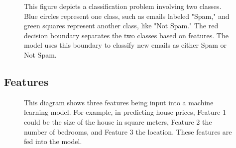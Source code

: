 \documentclass[12pt]{article}
\begin{document}
\begin{figure}[H]
\centering
{}
    \caption{This figure depicts a classification problem involving two classes. Blue circles represent one class, such as emails labeled "Spam," and green squares represent another class, like "Not Spam." The red decision boundary separates the two classes based on features. The model uses this boundary to classify new emails as either Spam or Not Spam.}
    \label{fig:regression_example}
\end{figure}

\subsection{Features}

\begin{figure}[H]
\centering
{}
    \caption{This diagram shows three features being input into a machine learning model. For example, in predicting house prices, Feature 1 could be the size of the house in square meters, Feature 2 the number of bedrooms, and Feature 3 the location. These features are fed into the model.}
    \label{fig:regression_example}
\end{figure}
\end{document}
